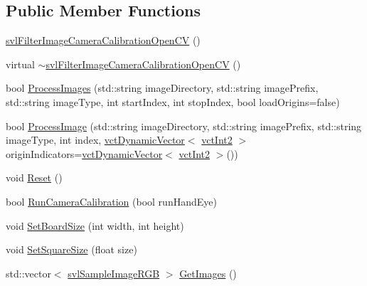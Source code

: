 \subsection*{Public Member Functions}
\begin{DoxyCompactItemize}
\item 
\hyperlink{classsvl_filter_image_camera_calibration_open_c_v_a2c77f9c063629d0fc149f7859f4e7e52}{svl\-Filter\-Image\-Camera\-Calibration\-Open\-C\-V} ()
\item 
virtual \hyperlink{classsvl_filter_image_camera_calibration_open_c_v_a2940bbcf67c365243f6da2a74c4a3e30}{$\sim$svl\-Filter\-Image\-Camera\-Calibration\-Open\-C\-V} ()
\item 
bool \hyperlink{classsvl_filter_image_camera_calibration_open_c_v_aae42bf360aec857e17a74c7f1a44a04a}{Process\-Images} (std\-::string image\-Directory, std\-::string image\-Prefix, std\-::string image\-Type, int start\-Index, int stop\-Index, bool load\-Origins=false)
\item 
bool \hyperlink{classsvl_filter_image_camera_calibration_open_c_v_adced02ce6b00c6432f3d688e9ba65dd2}{Process\-Image} (std\-::string image\-Directory, std\-::string image\-Prefix, std\-::string image\-Type, int index, \hyperlink{classvct_dynamic_vector}{vct\-Dynamic\-Vector}$<$ \hyperlink{vct_fixed_size_vector_types_8h_add8c88eb6a432b15f14b866b9c35325f}{vct\-Int2} $>$ origin\-Indicators=\hyperlink{classvct_dynamic_vector}{vct\-Dynamic\-Vector}$<$ \hyperlink{vct_fixed_size_vector_types_8h_add8c88eb6a432b15f14b866b9c35325f}{vct\-Int2} $>$())
\item 
void \hyperlink{classsvl_filter_image_camera_calibration_open_c_v_a567fe0a64ab133e3667c30f709265d3f}{Reset} ()
\item 
bool \hyperlink{classsvl_filter_image_camera_calibration_open_c_v_adc5b1f785c44fe4c16cf8c2398482230}{Run\-Camera\-Calibration} (bool run\-Hand\-Eye)
\item 
void \hyperlink{classsvl_filter_image_camera_calibration_open_c_v_ad8ad3ebc89b4f29773c53e854d5368b6}{Set\-Board\-Size} (int width, int height)
\item 
void \hyperlink{classsvl_filter_image_camera_calibration_open_c_v_a2cdde4ac83f9b6f48e8d94b3ab029665}{Set\-Square\-Size} (float size)
\item 
std\-::vector$<$ \hyperlink{svl_sample_image_types_8h_a54a55112dd3879f71f990d2945375f1a}{svl\-Sample\-Image\-R\-G\-B} $>$ \hyperlink{classsvl_filter_image_camera_calibration_open_c_v_ae328c3abd7409b2afcc8f1c557cee603}{Get\-Images} ()
\item 

\end{DoxyCompactItemize}
